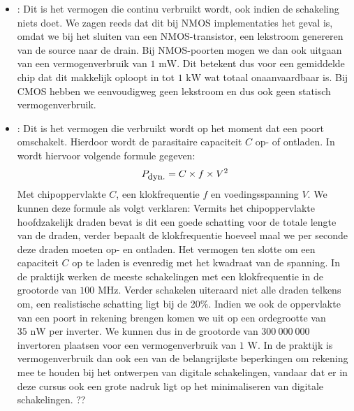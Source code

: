 \begin{itemize}
 \item {}: Dit is het vermogen die continu verbruikt wordt, ook indien de schakeling niets doet. We zagen reeds dat dit bij NMOS implementaties het geval is, omdat we bij het sluiten van een NMOS-transistor, een lekstroom genereren van de source naar de drain. Bij NMOS-poorten mogen we dan ook uitgaan van een vermogenverbruik van $1\mbox{ mW}$. Dit betekent dus voor een gemiddelde chip dat dit makkelijk oploopt in tot $1\mbox{ kW}$ wat totaal onaanvaardbaar is. Bij CMOS hebben we eenvoudigweg geen lekstroom en dus ook geen statisch vermogenverbruik.
 \item {}: Dit is het vermogen die verbruikt wordt op het moment dat een poort omschakelt. Hierdoor wordt de parasitaire capaciteit $C$ op- of ontladen. In \cite[3.12]{brown2004fundamentals} wordt hiervoor volgende formule gegeven:
\begin{equation}
P_{\mbox{\small{dyn.}}}=C\times f\times V^2
\end{equation}
Met chipoppervlakte $C$, een klokfrequentie $f$ en voedingsspanning $V$. We kunnen deze formule als volgt verklaren: Vermits het chipoppervlakte hoofdzakelijk draden bevat is dit een goede schatting voor de totale lengte van de draden, verder bepaalt de klokfrequentie hoeveel maal we per seconde deze draden moeten op- en ontladen. Het vermogen ten slotte om een capaciteit $C$ op te laden is evenredig met het kwadraat van de spanning. In de praktijk werken de meeste schakelingen met een klokfrequentie in de grootorde van $100\mbox{ MHz}$. Verder schakelen uiteraard niet alle draden telkens om, een realistische schatting ligt bij de 20\%. Indien we ook de oppervlakte van een poort in rekening brengen komen we uit op een ordegrootte van $35\mbox{ nW}$ per inverter. We kunnen dus in de grootorde van $300\ 000\ 000$ invertoren plaatsen voor een vermogenverbruik van $1\mbox{ W}$. In de praktijk is vermogenverbruik dan ook een van de belangrijkste beperkingen om rekening mee te houden bij het ontwerpen van digitale schakelingen, vandaar dat er in deze cursus ook een grote nadruk ligt op het minimaliseren van digitale schakelingen.
??%
\end{itemize}

